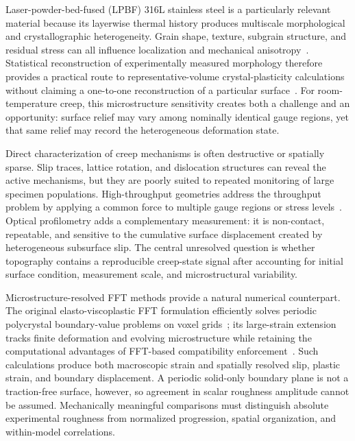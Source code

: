 \documentclass[final,12pt]{cas-sc}
\begin{document}
Laser-powder-bed-fused (LPBF) 316L stainless steel is a particularly relevant material because its layerwise thermal history produces multiscale morphological and crystallographic heterogeneity. Grain shape, texture, subgrain structure, and residual stress can all influence localization and mechanical anisotropy~\cite{charmi2021anisotropy,wang2024microstructure}. Statistical reconstruction of experimentally measured morphology therefore provides a practical route to representative-volume crystal-plasticity calculations without claiming a one-to-one reconstruction of a particular surface~\cite{bulgarevich2023rve}. For room-temperature creep, this microstructure sensitivity creates both a challenge and an opportunity: surface relief may vary among nominally identical gauge regions, yet that same relief may record the heterogeneous deformation state.

Direct characterization of creep mechanisms is often destructive or spatially sparse. Slip traces, lattice rotation, and dislocation structures can reveal the active mechanisms, but they are poorly suited to repeated monitoring of large specimen populations. High-throughput geometries address the throughput problem by applying a common force to multiple gauge regions or stress levels~\cite{SINGH2022103049,Jalali2020,Jalali2020a,XU2022111857,inman2025stochastic}. Optical profilometry adds a complementary measurement: it is non-contact, repeatable, and sensitive to the cumulative surface displacement created by heterogeneous subsurface slip. The central unresolved question is whether topography contains a reproducible creep-state signal after accounting for initial surface condition, measurement scale, and microstructural variability.

Microstructure-resolved FFT methods provide a natural numerical counterpart. The original elasto-viscoplastic FFT formulation efficiently solves periodic polycrystal boundary-value problems on voxel grids~\cite{LEBENSOHN201259}; its large-strain extension tracks finite deformation and evolving microstructure while retaining the computational advantages of FFT-based compatibility enforcement~\cite{nagra2017efficient,ZECEVIC2022104208}. Such calculations produce both macroscopic strain and spatially resolved slip, plastic strain, and boundary displacement. A periodic solid-only boundary plane is not a traction-free surface, however, so agreement in scalar roughness amplitude cannot be assumed. Mechanically meaningful comparisons must distinguish absolute experimental roughness from normalized progression, spatial organization, and within-model correlations.
\end{document}
